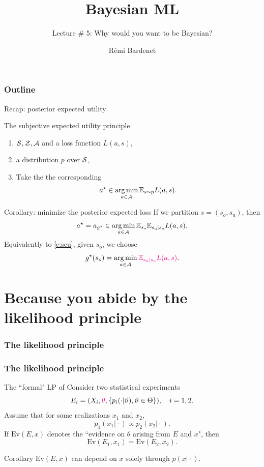 \documentclass[10pt]{beamer}
\title[Bayesian ML]{Bayesian ML}
\subtitle{Lecture \# 5: Why would you want to be Bayesian?}
\author[Rémi Bardenet (CNRS \& Univ. Lille)] %
{Rémi Bardenet}
\institute[] %
{
  CNRS \& CRIStAL, Univ. Lille, France\\
  \url{http://rbardenet.github.io}\\
\vspace{1cm}
}
\date{}
\begin{document}
\begin{frame}
\maketitle
\end{frame}

\begin{frame}
\frametitle{Outline}
\tableofcontents
\end{frame}

\begin{frame}{Recap: posterior expected utility}
  \begin{block}{The subjective expected utility principle}
  \begin{enumerate}
  \item {} $\mathcal{S}, \mathcal{Z}, \mathcal{A}$ and a loss function $L(a,s)$,
  \item {} a distribution $p$ over $\mathcal{S}$,
  \item Take the the corresponding 
  \begin{equation}
  a^\star \in \operatorname*{arg\,min}_{a\in\mathcal{A}} \mathbb{E}_{s\sim p} L(a,s).
  \label{e:seu}
  \end{equation}
  \end{enumerate}
  \end{block}
  \vfill

  \begin{block}{Corollary: minimize the posterior expected loss}
  If we partition $s=(s_{o}, s_{\text{u}})$, then
  $$ a^\star = a_{g^\star} \in \operatorname*{arg\,min}_{a\in\mathcal{A}} \mathbb{E}_{s_{o}} \mathbb{E}_{s_{\text{u}}\vert s_{o}} L(a,s).$$
  Equivalently to \eqref{e:seu}, given $s_o$, we choose
  $$
  g^\star(s_o) = \operatorname*{arg\,min}_{a\in\mathcal{A}} \textcolor{magenta}{\mathbb{E}_{s_{\text{u}}\vert s_{o}} L(a,s)}.$$
  \end{block}
\end{frame}

\section{Because you abide by the likelihood principle}
\begin{frame}
  \frametitle{The likelihood principle \citep{BeWo88}}
\end{frame}  

\begin{frame}
\frametitle{The likelihood principle \citep{BeWo88}}
\begin{block}{The ``formal" LP of \cite{BeWo88}}
  Consider two statistical experiments
  $$
  E_i=(X_i,\textcolor{magenta}{\theta}, \{p_i(\cdot\vert\vartheta), \vartheta\in\Theta\}), \quad i=1,2.
  $$
  Assume that for some realizations $x_1$ and $x_2$,
  $$
  p_1(x_1\vert\cdot) \propto p_2(x_2\vert \cdot).
  $$
  If $\text{Ev}(E,x)$ denotes the ``evidence on $\theta$ arising from $E$ and $x$", then
  $$
  \text{Ev}(E_1,x_1) = \text{Ev}(E_2,x_2).
  $$
\end{block}

\begin{exampleblock}{Corollary}
$\text{Ev}(E,x)$ can depend on $x$ solely through $p(x\vert\cdot)$.
\end{exampleblock}
\end{frame}
\end{document}
